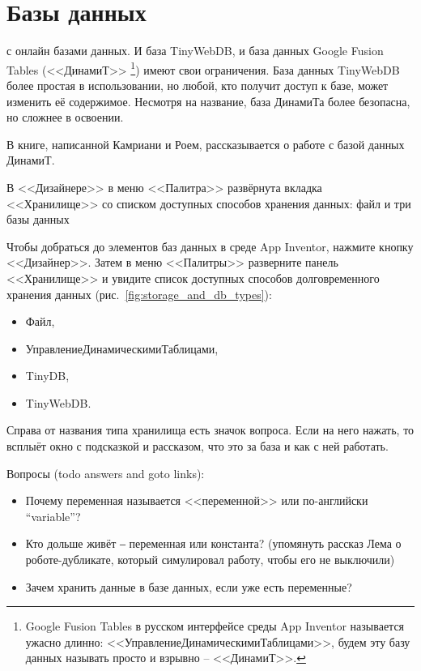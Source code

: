 \chapter{Базы данных}
\label{ch:databases}

 с онлайн базами данных. 
И база TinyWebDB, и база данных 
Google Fusion Tables (<<ДинамиТ>> 
\footnote[][-0.5cm]{
        Google Fusion Tables в русском интерфейсе среды App Inventor называется 
        ужасно длинно: <<УправлениеДинамическимиТаблицами>>, 
        будем эту базу данных называть просто и взрывно -- <<ДинамиТ>>. 
}) имеют свои ограничения.
База данных TinyWebDB более простая в использовании, 
но любой, кто получит доступ к базе, может изменить её содержимое. 
Несмотря на название, база ДинамиТа более безопасна, но сложнее в освоении. 

В книге, написанной Камриани и Роем\cite{KamrianiAndRoy2016}, 
рассказывается о работе с базой данных ДинамиТ. 

\begin{marginfigure}[-0em]
{%
\setlength{\fboxsep}{0pt}%
\setlength{\fboxrule}{1pt}%
%
}%
    \caption{В <<Дизайнере>> в меню <<Палитра>> развёрнута вкладка <<Хранилище>> 
    со списком доступных способов хранения данных: файл и три базы данных}
\label{fig:storage_and_db_types}
\end{marginfigure}

Чтобы добраться до элементов баз данных в среде App Inventor, 
нажмите кнопку <<Дизайнер>>. 
Затем в меню <<Палитры>> разверните панель <<Хранилище>> и увидите 
список доступных способов долговременного хранения данных (рис.~\ref{fig:storage_and_db_types}): 
\begin{itemize}
\item Файл,
\item УправлениеДинамическимиТаблицами,
\item TinyDB,
\item TinyWebDB.
\end{itemize}

Справа от названия типа хранилища есть значок вопроса. 
Если на него нажать, то всплыёт окно с подсказкой и рассказом, 
что это за база и как с ней работать.

Вопросы (todo answers and goto links): 
\begin{itemize}
\item Почему переменная называется <<переменной>> или по-английски ``variable''?
\item Кто дольше живёт ‒ переменная или константа? (упомянуть рассказ Лема о роботе-дубликате, 
    который симулировал работу, чтобы его не выключили)
\item Зачем хранить данные в базе данных, если уже есть переменные?
\end{itemize}
